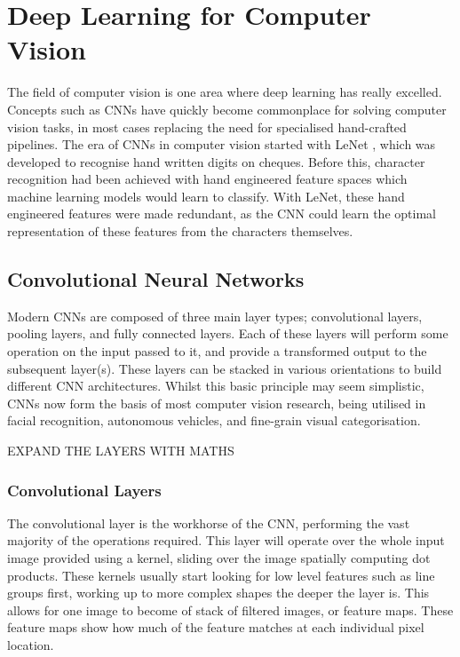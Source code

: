 \section{Deep Learning for Computer Vision}\label{ch:Background,sec:DLforCV}

The field of computer vision is one area where deep learning has really excelled. Concepts such as CNNs have quickly become commonplace for solving computer vision tasks, in most cases replacing the need for specialised hand-crafted pipelines. The era of CNNs in computer vision started with LeNet \cite{lecun_gradient-based_1998}, which was developed to recognise hand written digits on cheques. Before this, character recognition had been achieved with hand engineered feature spaces which machine learning models would learn to classify. With LeNet, these hand engineered features were made redundant, as the CNN could learn the optimal representation of these features from the characters themselves. 

\subsection{Convolutional Neural Networks}\label{ch:Background,sec:CNN,sub:CNN}
Modern CNNs are composed of three main layer types; convolutional layers, pooling layers, and fully connected layers. Each of these layers will perform some operation on the input passed to it, and provide a transformed output to the subsequent layer(s). These layers can be stacked in various orientations to build different CNN architectures. Whilst this basic principle may seem simplistic, CNNs now form the basis of most computer vision research, being utilised in facial recognition, autonomous vehicles, and fine-grain visual categorisation. 

EXPAND THE LAYERS WITH MATHS
\subsubsection{Convolutional Layers}\label{ch:Background,sec:CNN,sub:CNN,subsub:convolution}
The convolutional layer is the workhorse of the CNN, performing the vast majority of the operations required. This layer will operate over the whole input image provided using a kernel, sliding over the image spatially computing dot products. These kernels usually start looking for low level features such as line groups first, working up to more complex shapes the deeper the layer is. This allows for one image to become of stack of filtered images, or feature maps. These feature maps show how much of the feature matches at each individual pixel location. 

